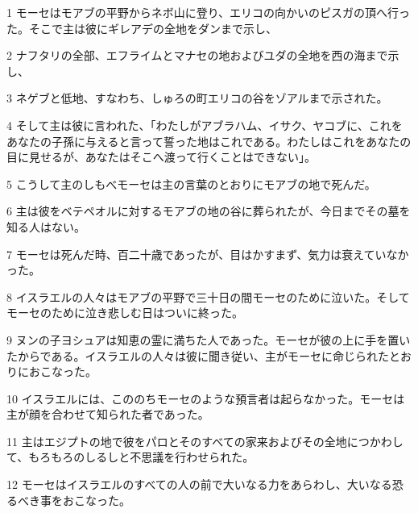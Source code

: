 \par 1 モーセはモアブの平野からネボ山に登り、エリコの向かいのピスガの頂へ行った。そこで主は彼にギレアデの全地をダンまで示し、
\par 2 ナフタリの全部、エフライムとマナセの地およびユダの全地を西の海まで示し、
\par 3 ネゲブと低地、すなわち、しゅろの町エリコの谷をゾアルまで示された。
\par 4 そして主は彼に言われた、「わたしがアブラハム、イサク、ヤコブに、これをあなたの子孫に与えると言って誓った地はこれである。わたしはこれをあなたの目に見せるが、あなたはそこへ渡って行くことはできない」。
\par 5 こうして主のしもべモーセは主の言葉のとおりにモアブの地で死んだ。
\par 6 主は彼をベテペオルに対するモアブの地の谷に葬られたが、今日までその墓を知る人はない。
\par 7 モーセは死んだ時、百二十歳であったが、目はかすまず、気力は衰えていなかった。
\par 8 イスラエルの人々はモアブの平野で三十日の間モーセのために泣いた。そしてモーセのために泣き悲しむ日はついに終った。
\par 9 ヌンの子ヨシュアは知恵の霊に満ちた人であった。モーセが彼の上に手を置いたからである。イスラエルの人々は彼に聞き従い、主がモーセに命じられたとおりにおこなった。
\par 10 イスラエルには、こののちモーセのような預言者は起らなかった。モーセは主が顔を合わせて知られた者であった。
\par 11 主はエジプトの地で彼をパロとそのすべての家来およびその全地につかわして、もろもろのしるしと不思議を行わせられた。
\par 12 モーセはイスラエルのすべての人の前で大いなる力をあらわし、大いなる恐るべき事をおこなった。


